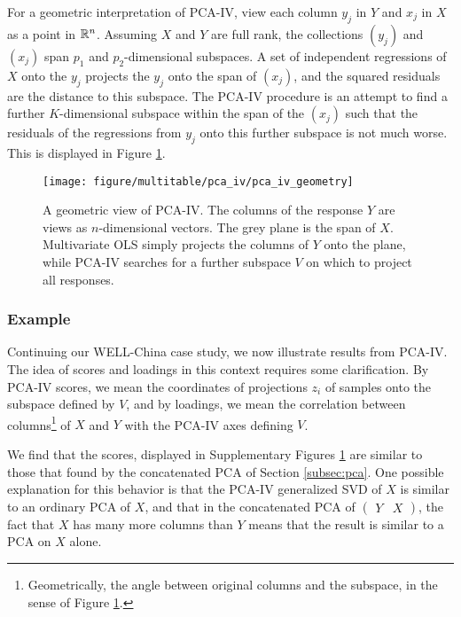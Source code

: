 \documentclass[utf8]{frontiersFPHY} %
\begin{document}
For a geometric interpretation of PCA-IV, view each column $y_{j}$ in $Y$ and
$x_{j}$ in $X$ as a point in $\mathbb{R}^{n}$. Assuming $X$ and $Y$ are full rank,
the collections $\left(y_{j}\right)$ and $\left(x_{j}\right)$ span $p_{1}$ and
$p_{2}$-dimensional subspaces. A set of independent regressions of $X$ onto the
$y_{j}$ projects the $y_{j}$ onto the span of $\left(x_{j}\right)$, and the
squared residuals are the distance to this subspace. The PCA-IV procedure is an
attempt to find a further $K$-dimensional subspace within the span of the
$\left(x_{j}\right)$ such that the residuals of the regressions from $y_j$ onto
this further subspace is not much worse. This is displayed in Figure
\ref{fig:pca_iv_geometry}.

\begin{figure}
  \centering
  \texttt{[image: figure/multitable/pca\_iv/pca\_iv\_geometry]}
  \caption{A geometric view of PCA-IV. The columns of the response $Y$ are views
    as $n$-dimensional vectors. The grey plane is the span of $X$. Multivariate
    OLS simply projects the columns of $Y$ onto the plane, while PCA-IV searches
    for a further subspace $V$ on which to project all
    responses. \label{fig:pca_iv_geometry} }
\end{figure}

\subsubsection{Example}
\label{subsec:pcaiv_example}

Continuing our WELL-China case study, we now illustrate results from PCA-IV. The
idea of scores and loadings in this context requires some clarification. By
PCA-IV scores, we mean the coordinates of projections $z_{i}$ of samples onto
the subspace defined by $V$, and by loadings, we mean the correlation between
columns\footnote{Geometrically, the angle between original columns and the
  subspace, in the sense of Figure \ref{fig:pca_iv_geometry}.} of $X$ and $Y$
with the PCA-IV axes defining $V$.

We find that the scores, displayed in Supplementary Figures
\ref{fig:pca_iv_geometry} are similar to those that found by the concatenated
PCA of Section \ref{subsec:pca}. One possible explanation for this behavior is
that the PCA-IV generalized SVD of $X$ is similar to an ordinary PCA of $X$, and
that in the concatenated PCA of $\begin{pmatrix}Y & X\end{pmatrix}$, the fact
  that $X$ has many more columns than $Y$ means that the result is similar to a
  PCA on $X$ alone.
\end{document}

